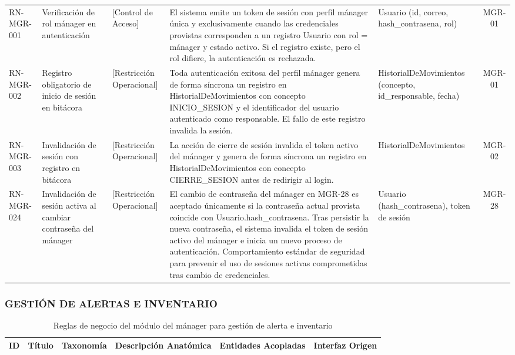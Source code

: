 \begin{landscape}
\begin{longtable}[c]{l p{2.1cm} p{2.1cm} p{8cm} p{4cm} c}
RN-MGR-001 & Verificación de rol mánager en autenticación & [Control de Acceso] & El sistema emite un token de sesión con perfil mánager única y exclusivamente cuando las credenciales provistas corresponden a un registro Usuario con rol = mánager y estado activo. Si el registro existe, pero el rol difiere, la autenticación es rechazada. & Usuario (id, correo, hash\_contrasena, rol) & MGR-01 \\
\addlinespace
RN-MGR-002 & Registro obligatorio de inicio de sesión en bitácora & [Restricción Operacional] & Toda autenticación exitosa del perfil mánager genera de forma síncrona un registro en HistorialDeMovimientos con concepto INICIO\_SESION y el identificador del usuario autenticado como responsable. El fallo de este registro invalida la sesión. & HistorialDeMovimientos (concepto, id\_responsable, fecha) & MGR-01 \\
\addlinespace
RN-MGR-003 & Invalidación de sesión con registro en bitácora & [Restricción Operacional] & La acción de cierre de sesión invalida el token activo del mánager y genera de forma síncrona un registro en HistorialDeMovimientos con concepto CIERRE\_SESION antes de redirigir al login. & HistorialDeMovimientos & MGR-02 \\
\addlinespace
RN-MGR-024 & Invalidación de sesión activa al cambiar contraseña del mánager & [Restricción Operacional] & El cambio de contraseña del mánager en MGR-28 es aceptado únicamente si la contraseña actual provista coincide con Usuario.hash\_contrasena. Tras persistir la nueva contraseña, el sistema invalida el token de sesión activo del mánager e inicia un nuevo proceso de autenticación. Comportamiento estándar de seguridad para prevenir el uso de sesiones activas comprometidas tras cambio de credenciales. & Usuario (hash\_contrasena), token de sesión & MGR-28 \\
\end{longtable}
\endgroup

\subsubsection{GESTIÓN DE ALERTAS E INVENTARIO}
\begingroup
\setlength{\LTleft}{\fill}
\setlength{\LTright}{\fill}

\begin{longtable}[c]{l p{2.1cm} p{2.1cm} p{8cm} p{4cm} c}
\caption{Reglas de negocio del módulo del mánager para gestión de alerta e inventario} \label{tab:reglas-negocio-manager-alertas}\\
\toprule
\textbf{ID} & \textbf{Título} & \textbf{Taxonomía} & \textbf{Descripción Anatómica} & \textbf{Entidades Acopladas} & \textbf{Interfaz Origen} \\
\midrule
\endfirsthead


\end{longtable}
\end{landscape}
